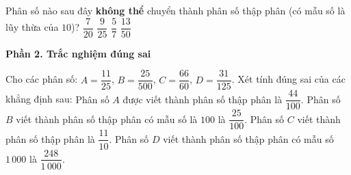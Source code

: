\begin{ex} %
Phân số nào sau đây \textbf{không thể} chuyển thành phân số thập phân (có mẫu số là lũy thừa của $10$)?
\choice
{$\dfrac{7}{20}$}
{$\dfrac{9}{25}$}
{\True $\dfrac{5}{7}$}
{$\dfrac{13}{50}$}
\end{ex}

\textbf{Phần 2. Trắc nghiệm đúng sai}

\begin{ex} %
Cho các phân số: $A = \dfrac{11}{25}$, $B = \dfrac{25}{500}$, $C = \dfrac{66}{60}$, $D = \dfrac{31}{125}$. Xét tính đúng sai của các khẳng định sau:
\choiceTF
{\True Phân số $A$ được viết thành phân số thập phân là $\dfrac{44}{100}$.}
{Phân số $B$ viết thành phân số thập phân có mẫu số là $100$ là $\dfrac{25}{100}$.}
{\True Phân số $C$ viết thành phân số thập phân là $\dfrac{11}{10}$.}
{\True Phân số $D$ viết thành phân số thập phân có mẫu số $1\,000$ là $\dfrac{248}{1\,000}$.}
\end{ex}

